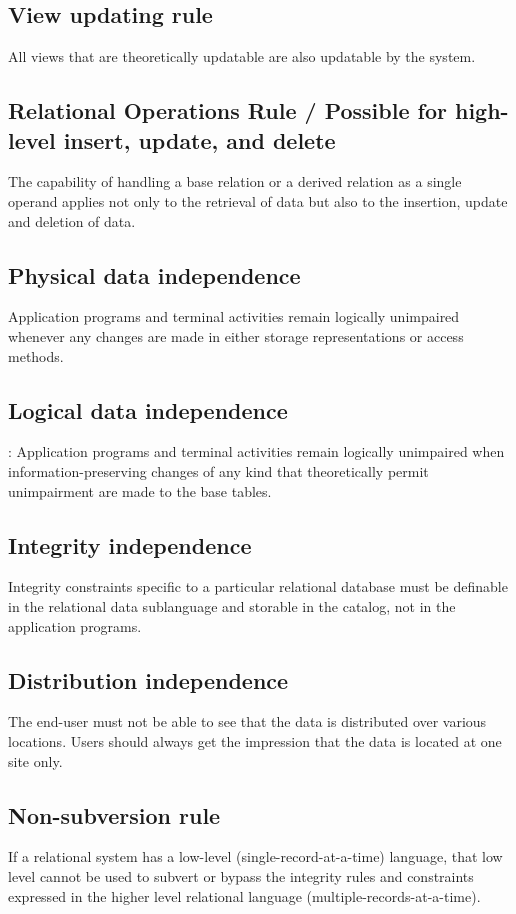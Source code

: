 \subsection{View updating rule}
  All views that are theoretically updatable are also updatable by the system.

\subsection{Relational Operations Rule / Possible for high-level insert, update, and delete}
  The capability of handling a base relation or a derived relation as a single operand applies not only to the retrieval of data but also to the insertion, update and deletion of data.

\subsection{Physical data independence}
  Application programs and terminal activities remain logically unimpaired whenever any changes are made in either storage representations or access methods.

\subsection{Logical data independence}:
  Application programs and terminal activities remain logically unimpaired when information-preserving changes of any kind that theoretically permit unimpairment are made to the base tables.

\subsection{Integrity independence}
  Integrity constraints specific to a particular relational database must be definable in the relational data sublanguage and storable in the catalog, not in the application programs.
  
\subsection{Distribution independence}
  The end-user must not be able to see that the data is distributed over various locations. Users should always get the impression that the data is located at one site only.

\subsection{Non-subversion rule}
  If a relational system has a low-level (single-record-at-a-time) language, that low level cannot be used to subvert or bypass the integrity rules and constraints expressed in the higher level relational language (multiple-records-at-a-time).



